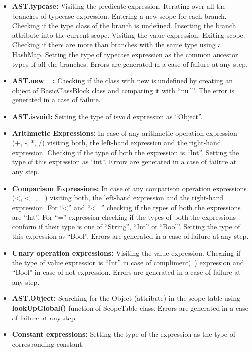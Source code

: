 \documentclass{article}
\begin{document}
\begin{itemize}
    \item \textbf{AST.typcase:} Visiting the predicate expression. Iterating over all the branches of typecase expression. Entering a new scope for each branch. Checking if the type class of the branch is undefined. Inserting the branch attribute into the current scope. Visiting the value expression. Exiting scope. Checking if there are more than branches with the same type using a HashMap. Setting the type of typecase expression as the common ancestor types of all the branches. Errors are generated in a case of failure at any step.
    \item \textbf{AST.new\_ :} Checking if the class with new is undefined by creating an object of BasicClassBlock class and comparing it with “null”. The error is generated in a case of failure.
    \item \textbf{AST.isvoid:} Setting the type of isvoid expression as “Object”.
    \item \textbf{Arithmetic Expressions:} In case of any arithmetic operation expression  (+, -, *, /) visiting both, the left-hand expression and the right-hand expression. Checking if the type of both the expression is “Int”. Setting the type of this expression as “int”. Errors are generated in a case of failure at any step.
    \item \textbf{Comparison Expressions:} In case of any comparison operation expressions (<, <=, =) visiting both, the left-hand expression and the right-hand expression. For “<” and “<=” checking if the types of both the expressions are “Int”. For “=” expression checking if the types of both the expressions conform if their type is one of “String”, “Int” or “Bool”. Setting the type of this expression as “Bool”. Errors are generated in a case of failure at any step.
    \item \textbf{Unary operation expressions:} Visiting the value expression. Checking if the type of value expression is “Int” in case of compliment(~) expression and “Bool” in case of not expression. Errors are generated in a case of failure at any step.
    \item \textbf{AST.Object:} Searching for the Object (attribute) in the scope table using \textbf{lookUpGlobal()} function of ScopeTable class. Errors are generated in a case of failure at any step.
    \item \textbf{Constant expressions:} Setting the type of the expression as the type of corresponding constant.

\end{itemize}
\end{document}
